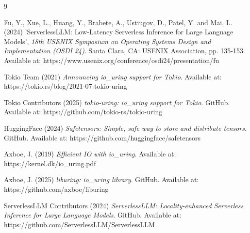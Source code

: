 \documentclass{article}
\begin{document}
\begin{thebibliography}{9}

Fu, Y., Xue, L., Huang, Y., Brabete, A., Ustiugov, D., Patel, Y. and Mai, L. (2024) 'ServerlessLLM: Low-Latency Serverless Inference for Large Language Models', \textit{18th USENIX Symposium on Operating Systems Design and Implementation (OSDI 24)}. Santa Clara, CA: USENIX Association, pp. 135-153. Available at: https://www.usenix.org/conference/osdi24/presentation/fu

Tokio Team (2021) \textit{Announcing io\_uring support for Tokio}. Available at: https://tokio.rs/blog/2021-07-tokio-uring

Tokio Contributors (2025) \textit{tokio-uring: io\_uring support for Tokio}. GitHub. Available at: https://github.com/tokio-rs/tokio-uring

HuggingFace (2024) \textit{Safetensors: Simple, safe way to store and distribute tensors}. GitHub. Available at: https://github.com/huggingface/safetensors

Axboe, J. (2019) \textit{Efficient IO with io\_uring}. Available at: https://kernel.dk/io\_uring.pdf

Axboe, J. (2025) \textit{liburing: io\_uring library}. GitHub. Available at: https://github.com/axboe/liburing

ServerlessLLM Contributors (2024) \textit{ServerlessLLM: Locality-enhanced Serverless Inference for Large Language Models}. GitHub. Available at: https://github.com/ServerlessLLM/ServerlessLLM

\end{thebibliography}
\end{document}
